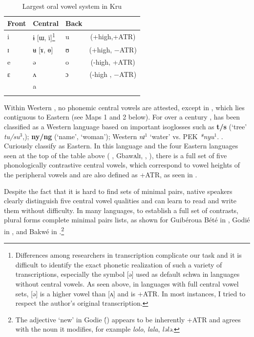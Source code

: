 \documentclass[output=paper,newtxmath,modfonts,nonflat]{langsci/langscibook}
\begin{document}
\begin{table}[b]
\begin{tabularx}{\textwidth}{XXXc}
\lsptoprule
Front & Central & Back\\
\midrule
i  &  ɨ [ɯ, ï]\footnote{Differences among researchers in transcription complicate our task and it is difficult to identify the exact phonetic realization of such a variety of transcriptions, especially the symbol [ə] used as default schwa in languages without central vowels. As seen above, in languages with full central vowel sets, [ə] is a higher vowel than [ʌ] and is +ATR. In most instances, I tried to respect the author’s original transcription.} & u  &  (+high,+ATR)\\

ɪ  &  ʉ [ɤ, ɵ]  & ʊ  &  (+high, −ATR) \\

e  &  ə  &  o  &  (-high, +ATR)\\

ɛ  &  ʌ  &  ɔ  &  (-high , −ATR) \\

& a\\
\lspbottomrule
\end{tabularx}	
\caption{Largest oral vowel system in Kru}
\label{tab:zogbo:5}
\end{table}
\largerpage[2]
Within Western , no phonemic central vowels are attested, except in , which lies contiguous to Eastern  (see Maps 1 and 2 below).  For over a century \citep{Delafosse1904},  has been classified as a Western  language based on important isoglosses such as \textbf{t/s} (‘tree’ \textit{tu/su$^3$},); \textbf{ny/ng} (‘name’, ‘woman’); Western \textit{nɪ}$^1$ ‘water’ vs. PEK \textit{*nyu}$^1$. \citep{Marchese1989}.  Curiously \citet{lewisetal2014} classify  as Eastern. In this language and the four Eastern languages seen at the top of the table above ( , Gbawʌlɪ, , ), 
\largerpage
there is a full set of five phonologically contrastive central vowels, which correspond to vowel heights of the peripheral vowels and are also defined as +ATR, as seen in .



Despite the fact that it is hard to find  sets of minimal pairs, native speakers clearly distinguish five central vowel qualities and can learn to read and write them without difficulty. In many languages, to establish a full set of contrasts, plural forms complete minimal pairs lists, as shown for Guibéroua Bété in , Godié in , and Bakwé in .\footnote{The adjective ‘new’ in Godie (́) appears to be inherently +ATR and agrees with the noun it modifies, for example \textit{lolo}, \textit{lala}, \textit{lələ}.}
 
\end{document}

